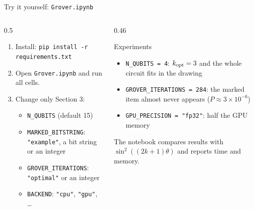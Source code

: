 \documentclass[aspectratio=169,11pt]{beamer}
\begin{document}
\begin{frame}{Try it yourself: \texttt{Grover.ipynb}}
  \begin{columns}[T]
    \begin{column}{0.5\textwidth}
      \begin{enumerate}
        \item Install: \texttt{pip install -r requirements.txt}
        \item Open \texttt{Grover.ipynb} and run all cells.
        \item Change only Section 3:
          \begin{itemize}
            \item \texttt{N\_QUBITS} (default 15)
            \item \texttt{MARKED\_BITSTRING}: \texttt{"example"}, a bit string or an integer
            \item \texttt{GROVER\_ITERATIONS}: \texttt{"optimal"} or an integer
            \item \texttt{BACKEND}: \texttt{"cpu"}, \texttt{"gpu"}, \dots
          \end{itemize}
      \end{enumerate}
    \end{column}
    \begin{column}{0.46\textwidth}
      \begin{block}{Experiments}
        \begin{itemize}
          \item \texttt{N\_QUBITS = 4}: $k_{\rm opt} = 3$ and the whole circuit fits in the drawing
          \item \texttt{GROVER\_ITERATIONS = 284}: the marked item almost never appears ($P \approx 3\times10^{-6}$)
          \item \texttt{GPU\_PRECISION = "fp32"}: half the GPU memory
        \end{itemize}
      \end{block}
      The notebook compares results with $\sin^2((2k+1)\theta)$ and reports time and memory.
    \end{column}
  \end{columns}
\end{frame}

\end{document}
